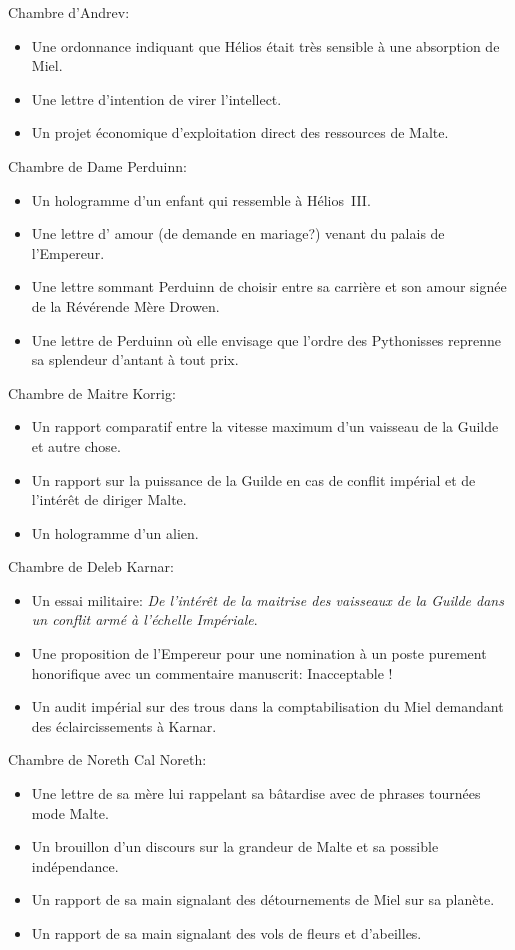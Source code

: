 \documentclass{article}
\begin{document}
Chambre d'Andrev:
\begin{itemize}
    \item Une ordonnance indiquant que Hélios était très sensible à une
        absorption de Miel.
    \item Une lettre d'intention de virer l'intellect.
    \item Un projet économique d'exploitation direct des ressources de Malte.
\end{itemize}

Chambre de Dame Perduinn:
\begin{itemize}
    \item Un hologramme d'un enfant qui ressemble à Hélios~III.
    \item Une lettre d' amour (de demande en mariage?) venant du palais de
        l'Empereur.
    \item Une lettre sommant Perduinn de choisir entre sa carrière et son amour
        signée de la Révérende Mère Drowen.
    \item Une lettre de Perduinn où elle envisage que l'ordre des Pythonisses
        reprenne sa splendeur d'antant à tout prix.
\end{itemize}

Chambre de Maitre Korrig:
\begin{itemize}
    \item Un rapport comparatif entre la vitesse maximum d'un vaisseau de la
        Guilde et \og autre chose\fg{}.
    \item Un rapport sur la puissance de la Guilde en cas de conflit impérial
        et de l'intérêt de diriger Malte.
    \item Un hologramme d'un alien.
\end{itemize}

Chambre de Deleb Karnar:
\begin{itemize}
    \item Un essai militaire: \textit{De l'intérêt de la maitrise des vaisseaux
        de la Guilde dans un conflit armé à l'échelle Impériale}.
    \item Une proposition de l'Empereur pour une nomination à un poste purement
        honorifique avec un commentaire manuscrit: \og Inacceptable !\fg{}
    \item Un audit impérial sur des trous dans la comptabilisation du Miel
        demandant des éclaircissements à Karnar.
\end{itemize}

Chambre de Noreth Cal Noreth:
\begin{itemize}
    \item Une lettre de sa mère lui rappelant sa bâtardise avec de phrases
        tournées mode Malte.
    \item Un brouillon d'un discours sur la grandeur de Malte et sa possible
        indépendance.
    \item Un rapport de sa main signalant des détournements de Miel sur sa
        planète.
    \item Un rapport de sa main signalant des vols de fleurs et d'abeilles.
\end{itemize}
\end{document}
